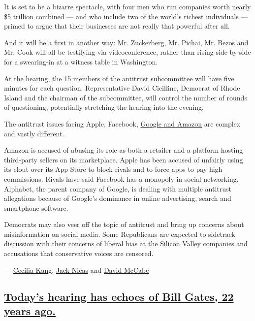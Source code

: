 It is set to be a bizarre spectacle, with four men who run companies
worth nearly \$5 trillion combined --- and who include two of the
world's richest individuals --- primed to argue that their businesses
are not really that powerful after all.

And it will be a first in another way: Mr. Zuckerberg, Mr. Pichai, Mr.
Bezos and Mr. Cook will all be testifying via videoconference, rather
than rising side-by-side for a swearing-in at a witness table in
Washington.

At the hearing, the 15 members of the antitrust subcommittee will have
five minutes for each question. Representative David Cicilline, Democrat
of Rhode Island and the chairman of the subcommittee, will control the
number of rounds of questioning, potentially stretching the hearing into
the evening.

The antitrust issues facing Apple, Facebook,
\href{https://www.nytimes3xbfgragh.onion/2019/06/02/business/google-antitrust-investigation.html}{Google
and Amazon} are complex and vastly different.

Amazon is accused of abusing its role as both a retailer and a platform
hosting third-party sellers on its marketplace. Apple has been accused
of unfairly using its clout over its App Store to block rivals and to
force apps to pay high commissions. Rivals have said Facebook has a
monopoly in social networking. Alphabet, the parent company of Google,
is dealing with multiple antitrust allegations because of Google's
dominance in online advertising, search and smartphone software.

Democrats may also veer off the topic of antitrust and bring up concerns
about misinformation on social media. Some Republicans are expected to
sidetrack discussion with their concerns of liberal bias at the Silicon
Valley companies and accusations that conservative voices are censored.

--- \href{https://www.nytimes3xbfgragh.onion/by/cecilia-kang}{Cecilia
Kang}, \href{https://www.nytimes3xbfgragh.onion/by/jack-nicas}{Jack
Nicas} and
\href{https://www.nytimes3xbfgragh.onion/by/david-mccabe}{David McCabe}

\hypertarget{todays-hearing-has-echoes-of-bill-gates-22-years-ago}{%
\subsection{\texorpdfstring{\protect\hyperlink{todays-hearing-has-echoes-of-bill-gates-22-years-ago}{Today's
hearing has echoes of Bill Gates, 22 years
ago.}}{Today's hearing has echoes of Bill Gates, 22 years ago.}}\label{todays-hearing-has-echoes-of-bill-gates-22-years-ago}}


